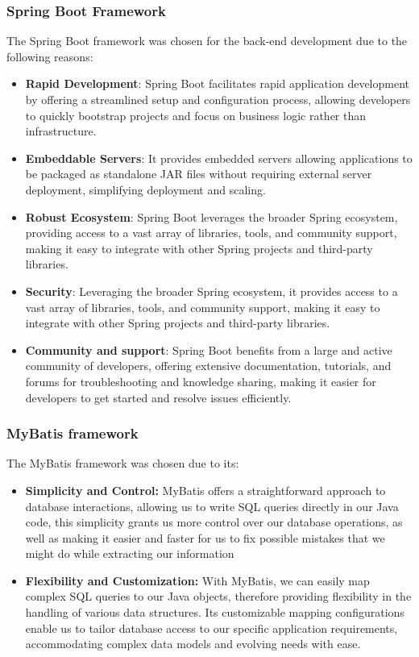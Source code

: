 \documentclass[table, 12pt]{article}
\begin{document}
\subsubsection{Spring Boot Framework}
The Spring Boot framework was chosen for the back-end development due to the following reasons:
\begin{itemize}
    \item \textbf{Rapid Development}: Spring Boot facilitates rapid application development by offering a streamlined setup and configuration process, allowing developers to quickly bootstrap projects and focus on business logic rather than infrastructure.
    \item \textbf{Embeddable Servers}: It provides embedded servers allowing applications to be packaged as standalone JAR files without requiring external server deployment, simplifying deployment and scaling.
    \item \textbf{Robust Ecosystem}: Spring Boot leverages the broader Spring ecosystem, providing access to a vast array of libraries, tools, and community support, making it easy to integrate with other Spring projects and third-party libraries.
    \item \textbf{Security}: Leveraging the broader Spring ecosystem, it provides access to a vast array of libraries, tools, and community support, making it easy to integrate with other Spring projects and third-party libraries.
    \item \textbf{Community and support}: Spring Boot benefits from a large and active community of developers, offering extensive documentation, tutorials, and forums for troubleshooting and knowledge sharing, making it easier for developers to get started and resolve issues efficiently.
\end{itemize}

\subsubsection{MyBatis framework}
The MyBatis framework was chosen due to its:
\begin{itemize}
    \item \textbf{Simplicity and Control:} MyBatis offers a straightforward approach to database interactions, allowing us to write SQL queries directly in our Java code, this simplicity grants us more control over our database operations, as well as making it easier and faster for us to fix possible mistakes that we might do while extracting our information
    \item \textbf{Flexibility and Customization:} With MyBatis, we can easily map complex SQL queries to our Java objects,  therefore providing flexibility in the handling of various data structures. Its customizable mapping configurations enable us to tailor database access to our specific application requirements, accommodating complex data models and evolving needs with ease.
\end{itemize}
\newpage
\end{document}
